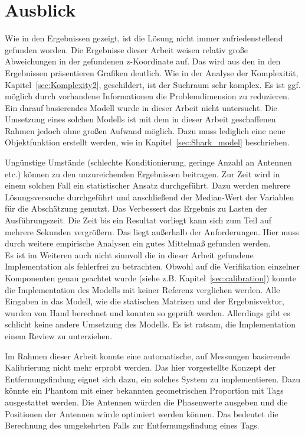 %
\section{Ausblick}
\label{sec:Calibration_Optimaztion}
%
Wie in den Ergebnissen gezeigt, ist die Lösung nicht immer zufriedenstellend gefunden worden. Die Ergebnisse dieser Arbeit weisen relativ große Abweichungen in der gefundenen z-Koordinate auf. Das wird aus den in den Ergebnissen präsentieren Grafiken deutlich. Wie in der Analyse der Komplexität, Kapitel~\ref{sec:Komplexity2}, geschildert, ist der Suchraum sehr komplex. Es ist ggf. möglich durch vorhandene Informationen die Problemdimension zu reduzieren. Ein darauf basierendes Modell wurde in dieser Arbeit nicht untersucht. Die Umsetzung eines solchen Modells ist mit dem in dieser Arbeit geschaffenen Rahmen jedoch ohne großen Aufwand möglich. Dazu muss lediglich eine neue Objektfunktion erstellt werden, wie in Kapitel~\ref{sec:Shark_model} beschrieben.

Ungünstige Umstände (schlechte Konditionierung, geringe Anzahl an Antennen etc.) können zu den unzureichenden Ergebnissen beitragen. Zur Zeit wird in einem solchen Fall ein statistischer Ansatz durchgeführt. Dazu werden mehrere Lösungsversuche durchgeführt und anschließend der Median-Wert der Variablen für die Abschätzung genutzt. Das Verbessert das Ergebnis zu Lasten der Ausführungszeit. Die Zeit bis ein Resultat vorliegt kann sich zum Teil auf mehrere Sekunden vergrößern. Das liegt außerhalb der Anforderungen. Hier muss durch weitere empirische Analysen ein gutes Mittelmaß gefunden werden.\\
%

Es ist im Weiteren auch nicht sinnvoll die in dieser Arbeit gefundene Implementation als fehlerfrei zu betrachten. Obwohl auf die Verifikation einzelner Komponenten genau geachtet wurde (siehe z.B. Kapitel~\ref{sec:calibration}) konnte die Implementation des Modells mit keiner Referenz verglichen werden. Alle Eingaben in das Modell, wie die statischen Matrizen und der Ergebnisvektor, wurden von Hand berechnet und konnten so geprüft werden. Allerdings gibt es schlicht keine andere Umsetzung des Modells. Es ist ratsam, die Implementation einem Review zu unterziehen.
%

Im Rahmen dieser Arbeit konnte eine automatische, auf Messungen basierende Kalibrierung nicht mehr erprobt werden. Das hier vorgestellte Konzept der Entfernungsfindung eignet sich dazu, ein solches System zu implementieren. Dazu könnte ein Phantom mit einer bekannten geometrischen Proportion mit Tags ausgestattet werden. Die Antennen würden die Phasenwerte ausgeben und die Positionen der Antennen würde optimiert werden können. Das bedeutet die Berechnung des umgekehrten Falls zur Entfernungsfindung eines Tags.\\
%

